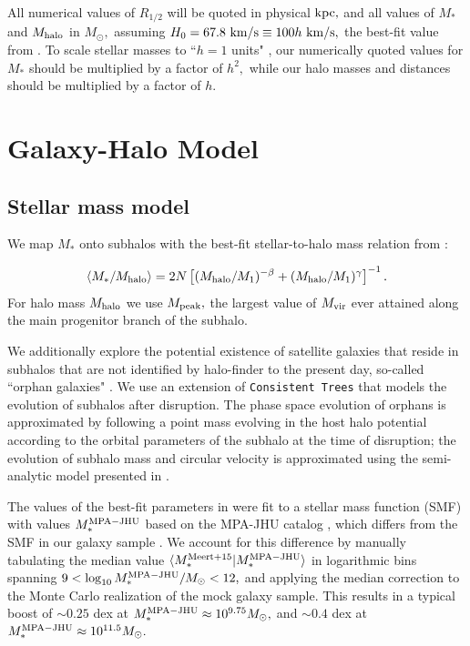 \documentclass[usenatbib,usegraphicx,letterpaper]{mn2e}
\newcommand{\rhalf}{R_{1/2}}
\newcommand{\mstar}{M_{\ast}}
\newcommand{\mvir}{M_{\rm vir}}
\newcommand{\mpeak}{M_{\rm peak}}
\newcommand{\mhalo}{M_{\rm halo}}
\newcommand{\kpc}{{\rm kpc}}
\newcommand{\msun}{M_\odot}
\newcommand{\kms}{{\rm km/s}}
\begin{document}
All numerical values of $\rhalf$ will be quoted in physical $\kpc,$ and all values of $\mstar$ and $\mhalo$ in $\msun,$ assuming $H_0=67.8~\kms\equiv100h~\kms,$ the best-fit value from \citet{planck15}. To scale stellar masses to ``$h=1$ units" \citep{croton13}, our numerically quoted values for $\mstar$ should be multiplied by a factor of $h^2,$ while our halo masses and distances should be multiplied by a factor of $h.$


\section{Galaxy-Halo Model}
\label{sec:model}

\subsection{Stellar mass model}
\label{subsec:model}

We map $\mstar$ onto subhalos with the best-fit stellar-to-halo mass relation from \citet{moster_etal13}:

\begin{equation}
\label{eq:smhm}
\langle\mstar/\mhalo\rangle = 2N\left[(\mhalo/M_{1})^{-\beta} + (\mhalo/M_1)^{\gamma}\right]^{-1}.
\end{equation}
For halo mass $\mhalo$ we use $\mpeak,$ the largest value of $\mvir$ ever attained along the main progenitor branch of the subhalo. 

We additionally explore the potential existence of satellite galaxies that reside in subhalos that are not identified by halo-finder to the present day, so-called ``orphan galaxies" \citep[see, e.g.,][]{campbell_etal17}. We use an extension of {\tt Consistent Trees} that models the evolution of subhalos after disruption. The phase space evolution of orphans is approximated by following a point mass evolving in the host halo potential according to the orbital parameters of the subhalo at the time of disruption; the evolution of subhalo mass and circular velocity is approximated using the semi-analytic model presented in \citet{jiang_vdB14}.   

The values of the best-fit parameters in \citet{moster_etal13} were fit to a stellar mass function (SMF) with values $\mstar^{\rm MPA-JHU}$ based on the MPA-JHU catalog \citep{kauffmann_etal03,brinchmann_etal04}, which differs from the SMF in our galaxy sample \citep[see, e.g.,][]{bernardi_etal14}. We account for this difference by manually tabulating the median value $\langle\mstar^{\rm Meert+15}\vert\mstar^{\rm MPA-JHU}\rangle$ in logarithmic bins spanning $9 < \log_{10}\mstar^{\rm MPA-JHU}/\msun < 12,$ and applying the median correction to the Monte Carlo realization of the mock galaxy sample. This results in a typical boost of $\sim0.25$ dex at $\mstar^{\rm MPA-JHU}\approx10^{9.75}\msun,$ and $\sim0.4$ dex at $\mstar^{\rm MPA-JHU}\approx10^{11.5}\msun.$ 
\end{document}
